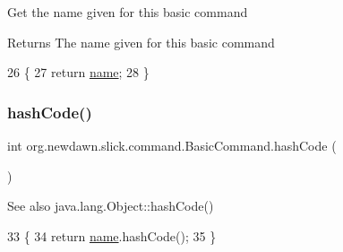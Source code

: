 Get the name given for this basic command

\begin{DoxyReturn}{Returns}
The name given for this basic command 
\end{DoxyReturn}

\begin{DoxyCode}
26                             \{
27         \textcolor{keywordflow}{return} \mbox{\hyperlink{classorg_1_1newdawn_1_1slick_1_1command_1_1_basic_command_a50a5c3e66d1f02b990807d882daddce2}{name}};
28     \}
\end{DoxyCode}
\mbox{\label{classorg_1_1newdawn_1_1slick_1_1command_1_1_basic_command_a92181ea905147c3e2b869347e40cad0c}} 
\subsubsection{\texorpdfstring{hash\+Code()}{hashCode()}}
{\footnotesize\ttfamily int org.\+newdawn.\+slick.\+command.\+Basic\+Command.\+hash\+Code (\begin{DoxyParamCaption}{ }\end{DoxyParamCaption})\hspace{0.3cm}{\ttfamily [inline]}}

\begin{DoxySeeAlso}{See also}
java.\+lang.\+Object\+::hash\+Code() 
\end{DoxySeeAlso}

\begin{DoxyCode}
33                           \{
34         \textcolor{keywordflow}{return} \mbox{\hyperlink{classorg_1_1newdawn_1_1slick_1_1command_1_1_basic_command_a50a5c3e66d1f02b990807d882daddce2}{name}}.hashCode();
35     \}
\end{DoxyCode}
\mbox{\label{classorg_1_1newdawn_1_1slick_1_1command_1_1_basic_command_acbf44f5b863bf9e38387880905e64949}} 
